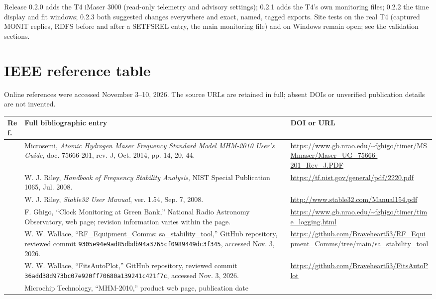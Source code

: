 \documentclass[11pt,a4paper]{article}
\begin{document}
Release 0.2.0 adds the T4 iMaser 3000 (read-only telemetry and advisory
settings); 0.2.1 adds the T4's own monitoring files; 0.2.2 the time display and fit windows;
0.2.3 both suggested changes everywhere and exact, named, tagged exports.
Site tests on the real T4
(captured MONIT replies, RDFS before and after a SETFSREL entry, the main
monitoring file) and on Windows remain open; see the validation sections.

\section{IEEE reference table}
Online references were accessed November 3--10, 2026. The source URLs are retained
in full; absent DOIs or unverified publication details are not invented.

\small
\begin{longtable}{@{}p{.05\linewidth}p{.53\linewidth}p{.34\linewidth}@{}}
\toprule
Ref. & Full bibliographic entry & DOI or URL\\
\midrule
\endhead
[1] & Microsemi, \textit{Atomic Hydrogen Maser Frequency Standard Model
MHM-2010 User's Guide}, doc. 75666-201, rev. J, Oct. 2014, pp. 14, 20, 44.
& \url{https://www.gb.nrao.edu/~fghigo/timer/MSMmaser/Maser_UG_75666-201_Rev_J.PDF}\\[5pt]
[2] & W. J. Riley, \textit{Handbook of Frequency Stability Analysis},
NIST Special Publication 1065, Jul. 2008.
& \url{https://tf.nist.gov/general/pdf/2220.pdf}\\[5pt]
[3] & W. J. Riley, \textit{Stable32 User Manual}, ver. 1.54,
Sep. 7, 2008.
& \url{http://www.stable32.com/Manual154.pdf}\\[5pt]
[4] & F. Ghigo, ``Clock Monitoring at Green Bank,'' National Radio Astronomy
Observatory, web page; revision information varies within the page.
& \url{https://www.gb.nrao.edu/~fghigo/timer/time_logging.html}\\[5pt]
[5] & W. W. Wallace, ``RF\_Equipment\_Comms: sa\_stability\_tool,''
GitHub repository, reviewed commit
\texttt{9305e94e9ad85dbdb94a3765cf0989449dc3f345}, accessed Nov. 3, 2026.
& \url{https://github.com/Braveheart53/RF_Equipment_Comms/tree/main/sa_stability_tool}\\[5pt]
[6] & W. W. Wallace, ``FitsAutoPlot,'' GitHub repository, reviewed commit
\texttt{36add38d973bc07e920ff70680a139241c421f7c}, accessed Nov. 3, 2026.
& \url{https://github.com/Braveheart53/FitsAutoPlot}\\[5pt]
[7] & Microchip Technology, ``MHM-2010,'' product web page, publication date

\end{longtable}
\end{document}
